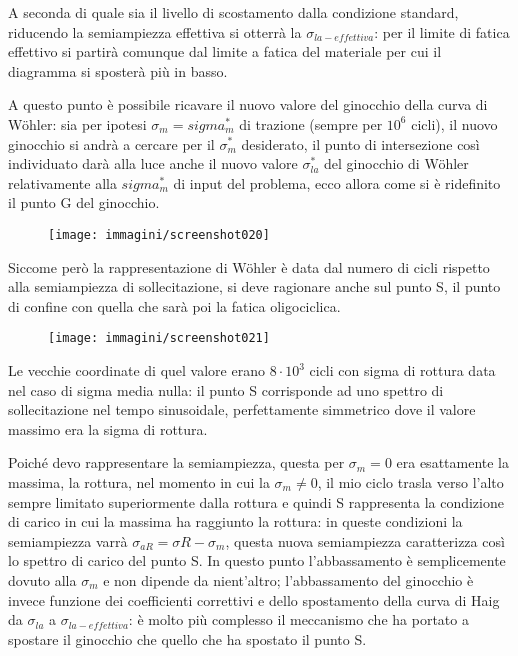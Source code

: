\documentclass{article}
\begin{document}
\begin{adjustwidth}{2in}{}
			A seconda di quale sia il livello di scostamento dalla condizione standard, riducendo la semiampiezza effettiva si otterrà la $\sigma_{la-effettiva}$: per il limite di fatica effettivo si partirà comunque dal limite a fatica del materiale per cui il diagramma si sposterà più in basso. \newline 
			
			A questo punto è possibile ricavare il nuovo valore del ginocchio della curva di Wöhler: sia per ipotesi $\sigma_m = sigma_m^*$ di trazione (sempre per $10^6$ cicli), il nuovo ginocchio si andrà a cercare per il $\sigma_m^*$ desiderato, il punto di intersezione così individuato darà alla luce anche il nuovo valore $\sigma_{la}^*$ del ginocchio di Wöhler relativamente alla $sigma_m^*$ di input del problema, ecco allora come si è ridefinito il punto G del ginocchio.
			\begin{figure}[H]
				\centering
				\texttt{[image: immagini/screenshot020]}
				\label{fig:screenshot020}
			\end{figure}			 						
			Siccome però la rappresentazione di Wöhler è data dal numero di cicli rispetto alla semiampiezza di sollecitazione, si deve ragionare anche sul punto S, il punto di confine con quella che sarà poi la fatica oligociclica.
			\begin{figure}[H]
				\centering
				\texttt{[image: immagini/screenshot021]}
				\label{fig:screenshot021}
			\end{figure}			
			 Le vecchie coordinate di quel valore erano $8\cdot10^3$ cicli con sigma di rottura data nel caso di sigma media nulla: il punto S corrisponde ad uno spettro di sollecitazione nel tempo sinusoidale, perfettamente simmetrico dove il valore massimo era la sigma di rottura. 
			 
			 Poiché devo rappresentare la semiampiezza, questa per $\sigma_m=0$ era esattamente la massima, la rottura, nel momento in cui la $\sigma_m\ne0$, il mio ciclo trasla verso l'alto sempre limitato superiormente dalla rottura e quindi S rappresenta la condizione di carico in cui la massima ha raggiunto la rottura: in queste condizioni la semiampiezza varrà $\sigma_{aR} = \sigma{R} -\sigma_m$, questa nuova semiampiezza caratterizza così lo spettro di carico del punto S. In questo punto l'abbassamento è semplicemente dovuto alla $\sigma_m$ e non dipende da nient'altro; l'abbassamento del ginocchio è invece funzione dei coefficienti correttivi e dello spostamento della curva di Haig da $\sigma_{la}$ a $\sigma_{la-effettiva}$: è molto più complesso il meccanismo che ha portato a spostare il ginocchio che quello che ha spostato il punto S. \newline
						

\end{adjustwidth}
\end{document}
